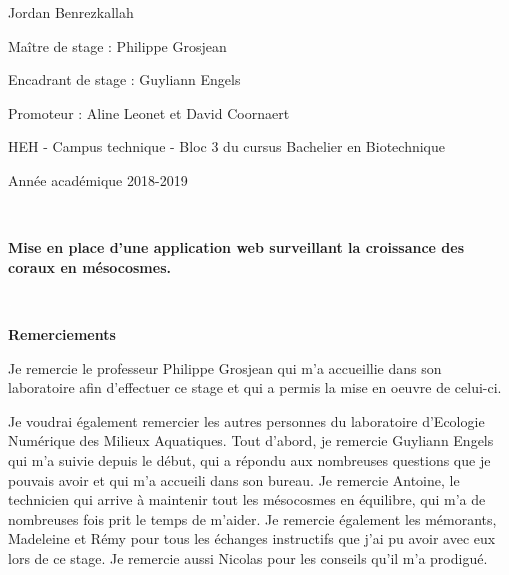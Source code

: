 \documentclass[]{report}
\begin{document}
\begin{centering}
\vspace{1 cm}

\Large

Jordan Benrezkallah

\vspace{2 cm}

\normalsize
Maître de stage : Philippe Grosjean

Encadrant de stage : Guyliann Engels

Promoteur : Aline Leonet et David Coornaert


\vspace{3.5 cm}

\normalsize
HEH - Campus technique -
Bloc 3 du cursus Bachelier en Biotechnique

Année académique 2018-2019

\end {centering}

\newpage

\null
\newpage

\begin{centering}



\textcolor{white}{.}





\vfill

\huge 
{\bf Mise en place d'une application web surveillant la croissance des coraux en mésocosmes.}

\vfill


\end {centering}

\null
\newpage

\textcolor{white}{.}

\Huge 
{\bf Remerciements} \vspace{1 cm}

\normalsize
Je remercie le professeur Philippe Grosjean qui m'a accueillie dans son
laboratoire afin d'effectuer ce stage et qui a permis la mise en oeuvre
de celui-ci.

Je voudrai également remercier les autres personnes du laboratoire
d'Ecologie Numérique des Milieux Aquatiques. Tout d'abord, je remercie
Guyliann Engels qui m'a suivie depuis le début, qui a répondu aux
nombreuses questions que je pouvais avoir et qui m'a accueili dans son
bureau. Je remercie Antoine, le technicien qui arrive à maintenir tout
les mésocosmes en équilibre, qui m'a de nombreuses fois prit le temps de
m'aider. Je remercie également les mémorants, Madeleine et Rémy pour
tous les échanges instructifs que j'ai pu avoir avec eux lors de ce
stage. Je remercie aussi Nicolas pour les conseils qu'il m'a prodigué.
\end{document}
